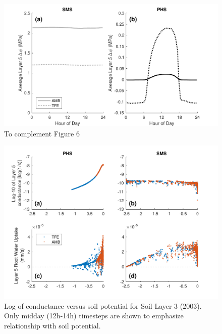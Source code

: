 \documentclass[draft,linenumbers]{agujournal}
\begin{document}
 

        \begin{figure}[h]
     \centering
     \includegraphics[width=30pc]{../figs3/suppdp.pdf}
     \caption{To complement Figure 6}
     \label{supp:cond}
  \end{figure}
  \clearpage
  
  
  \begin{figure}[h]
     \centering
     \includegraphics[width=30pc]{../figs3/suppcond.pdf}
     \caption{Log of conductance versus soil potential for Soil Layer 3 (2003).
     Only midday (12h-14h) timesteps are shown to emphasize relationship with soil potential.}
     \label{supp:cond2}
  \end{figure}
  \clearpage
\end{document}
